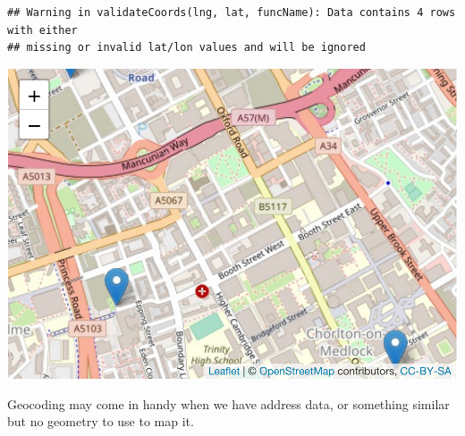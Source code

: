 \documentclass[
]{book}
\newenvironment{Shaded}{\begin{snugshade}}{\end{snugshade}}
\newcommand{\AttributeTok}[1]{\textcolor[rgb]{0.77,0.63,0.00}{#1}}
\newcommand{\FunctionTok}[1]{\textcolor[rgb]{0.00,0.00,0.00}{#1}}
\newcommand{\NormalTok}[1]{#1}
\newcommand{\OtherTok}[1]{\textcolor[rgb]{0.56,0.35,0.01}{#1}}
\newcommand{\SpecialCharTok}[1]{\textcolor[rgb]{0.00,0.00,0.00}{#1}}
\begin{document}
\begin{Shaded}
\end{Shaded}

\begin{verbatim}
## Warning in validateCoords(lng, lat, funcName): Data contains 4 rows with either
## missing or invalid lat/lon values and will be ignored
\end{verbatim}

\includegraphics{crime_mapping_files/figure-latex/unnamed-chunk-50-1.pdf}

Geocoding may come in handy when we have address data, or something similar but no geometry to use to map it.
\end{document}
